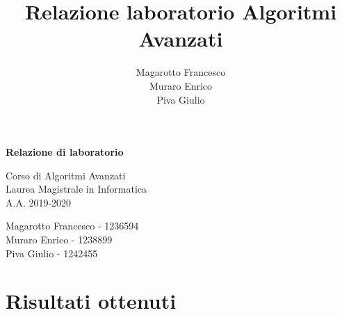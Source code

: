 \documentclass[a4paper]{article}
\title{Relazione laboratorio Algoritmi Avanzati}
\author{Magarotto Francesco\\Muraro Enrico\\Piva Giulio}
\begin{document}
\begin{titlepage}
  \vspace*{5cm}
  \begin{center}
    \Large\bfseries
    Relazione di laboratorio
  \end{center}
  \begin{center}
    \large
    Corso di Algoritmi Avanzati\\
    Laurea Magistrale in Informatica\\A.A. 2019-2020
  \end{center}
  \vspace{4cm plus 1fill}
  \begin{flushleft}
    \large
    Magarotto Francesco - 1236594\\Muraro Enrico - 1238899 \\Piva Giulio - 1242455
  \end{flushleft}
\end{titlepage}
\newpage



\section{Risultati ottenuti}
\begin{figure}[H]
	\centering
	
\end{figure}
\end{document}
